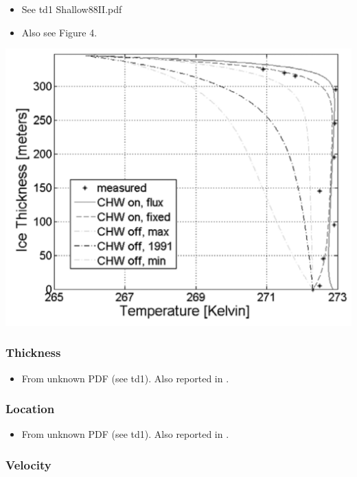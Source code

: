 \documentclass[article,a4paper,times,11pt,twoside]{article}
\begin{document}
\begin{itemize}
\item See td1 Shallow88II.pdf
\item Also see \textcite{phillips_2010} Figure 4.
\end{itemize}

\begin{center}
\includegraphics[width=.9\linewidth]{td3/phillips_2010_fig4.png}
\end{center}

\subsubsection{Thickness}
\label{sec:org9a575c8}

\begin{itemize}
\item From unknown PDF (see td1). Also reported in \textcite{phillips_2010}.
\end{itemize}

\subsubsection{Location}
\label{sec:org71bd2b2}

\begin{itemize}
\item From unknown PDF (see td1). Also reported in \textcite{phillips_2010}.
\end{itemize}

\subsubsection{Velocity}
\label{sec:org5cfdd7d}
\clearpage
\end{document}
